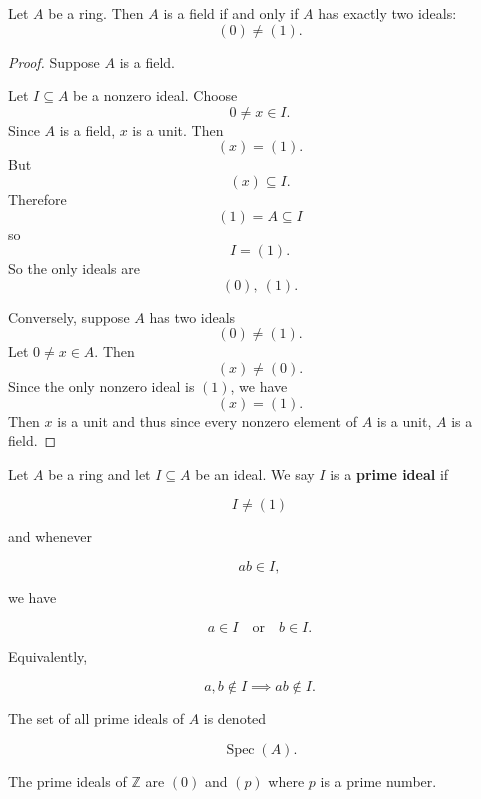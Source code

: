 \documentclass[11pt]{article}
\begin{document}
\begin{thm}
    Let $A$ be a ring. Then $A$ is a field if and only if 
    $A$ has exactly two ideals: 
    \[
        (0) \neq (1). 
    \]
\end{thm}
\begin{proof}
    Suppose $A$ is a field. 

    Let $I \subseteq A$ be a nonzero ideal. Choose 
    \[
        0 \neq x \in I. 
    \]
    Since $A$ is a field, $x$ is a unit. Then 
    \[
        (x) = (1). 
    \]
    But 
    \[
        (x) \subseteq I. 
    \]
    Therefore 
    \[
        (1) = A \subseteq I
    \]
    so 
    \[
        I = (1). 
    \]
    So the only ideals are 
    \[
        (0), \ (1). 
    \]

    Conversely, suppose $A$ has two ideals 
    \[
        (0) \neq (1). 
    \]
    Let $0 \neq x \in A$. Then 
    \[
        (x) \neq (0). 
    \]
    Since the only nonzero ideal is $(1)$, we have 
    \[
        (x) = (1). 
    \]
    Then $x$ is a unit and thus since every nonzero element of 
    $A$ is a unit, $A$ is a field. 
\end{proof}

\begin{defn}
    Let $A$ be a ring and let $I\subseteq A$ be an ideal. 
    We say $I$ is a \textbf{prime ideal} if

    $$I\neq(1)$$

    and whenever

    $$ab\in I,$$

    we have

    $$a\in I\quad\text{or}\quad b\in I.$$

    Equivalently,

    $$a,b\notin I\implies ab\notin I.$$

    The set of all prime ideals of $A$ is denoted

    $$\operatorname{Spec}(A).$$
\end{defn}

\begin{ex}
    The prime ideals of $\mathbb Z$ are 
    $(0)$ and $(p)$ where $p$ is a prime number. 
\end{ex}
\end{document}
